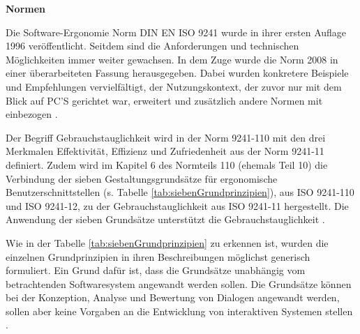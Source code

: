 \textbf{Normen}

Die Software-Ergonomie Norm \gls{DIN} \gls{EN} \gls{ISO} 9241 wurde in ihrer ersten Auflage 1996 veröffentlicht. Seitdem sind die Anforderungen und technischen Möglichkeiten immer weiter gewachsen. In dem Zuge wurde die Norm 2008 in einer überarbeiteten Fassung herausgegeben. Dabei wurden konkretere Beispiele und Empfehlungen vervielfältigt, der Nutzungskontext, der zuvor nur mit dem Blick auf PC'S gerichtet war, erweitert und zusätzlich andere Normen mit einbezogen \citep[vgl.][]{schneider2008}.

Der Begriff Gebrauchstauglichkeit wird in der Norm 9241-110 mit den drei Merkmalen Effektivität, Effizienz und Zufriedenheit aus der Norm 9241-11 definiert. Zudem wird im Kapitel 6 des Normteils 110 (ehemals Teil 10) die Verbindung der sieben Gestaltungsgrundsätze für ergonomische Benutzerschnittstellen (s. Tabelle \ref{tab:siebenGrundprinzipien}), aus ISO 9241-110 und ISO 9241-12, zu der Gebrauchstauglichkeit aus ISO 9241-11 hergestellt. Die Anwendung der sieben Grundsätze unterstützt die Gebrauchstauglichkeit \citep[vgl.][Kap. 6]{ISO9241-110}.

Wie in der Tabelle \ref{tab:siebenGrundprinzipien} zu erkennen ist, wurden die einzelnen Grundprinzipien in ihren Beschreibungen möglichst generisch formuliert. Ein Grund dafür ist, dass die Grundsätze unabhängig vom betrachtenden Softwaresystem angewandt werden sollen. Die Grundsätze können bei der Konzeption, Analyse und Bewertung von Dialogen angewandt werden, sollen aber keine Vorgaben an die Entwicklung von interaktiven Systemen stellen \citep[vgl.][Kap. 4.1]{ISO9241-110}.

